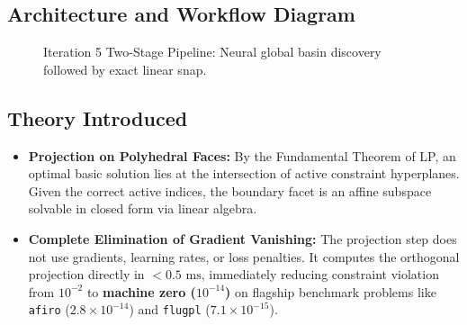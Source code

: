 \documentclass[11pt,a4paper]{article}
\begin{document}
\subsection{Architecture and Workflow Diagram}

\begin{figure}[H]
\centering
{}
\caption{Iteration 5 Two-Stage Pipeline: Neural global basin discovery followed by exact linear snap.}
\end{figure}

\subsection{Theory Introduced}
\begin{itemize}[leftmargin=1.5em, itemsep=2pt]
    \item \textbf{Projection on Polyhedral Faces:} By the Fundamental Theorem of LP, an optimal basic solution lies at the intersection of active constraint hyperplanes. Given the correct active indices, the boundary facet is an affine subspace solvable in closed form via linear algebra.
    \item \textbf{Complete Elimination of Gradient Vanishing:} The projection step does not use gradients, learning rates, or loss penalties. It computes the orthogonal projection directly in $< 0.5\text{ ms}$, immediately reducing constraint violation from $10^{-2}$ to \textbf{machine zero ($10^{-14}$)} on flagship benchmark problems like \texttt{afiro} ($2.8 \times 10^{-14}$) and \texttt{flugpl} ($7.1 \times 10^{-15}$).
\end{itemize}
\end{document}
